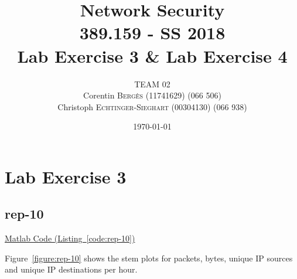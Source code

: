 \documentclass{article}
\title{Network Security \\ 389.159 - SS 2018 \\ Lab Exercise 3 \& Lab Exercise 4} %
\author{
    TEAM 02 \\
    Corentin \textsc{Bergès} (11741629) (066 506) \\
    Christoph \textsc{Echtinger-Sieghart} (00304130) (066 938)
}
\date{\today} %
\newcommand{\codelink}[1]{%
    \hyperref[#1]{\faArrowCircleRight\enskip Matlab Code (Listing~\ref{#1})}%
}
\begin{document}
\maketitle %
\renewcommand{\arraystretch}{2} %

\listoffixmes

\section{Lab Exercise 3}

\subsection{rep-10 }

\codelink{code:rep-10}

Figure~\ref{figure:rep-10} shows the stem plots for packets, bytes, unique IP sources and
unique IP destinations per hour.
\end{document}
